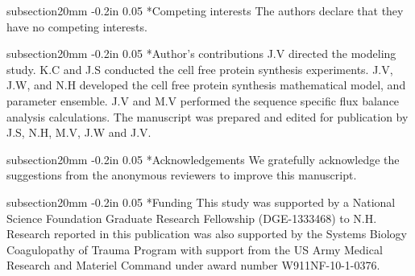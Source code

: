 \documentclass[12pt]{article}
\makeatletter
\renewcommand\section{\@startsection
	{subsection}{2}{0mm}
	{-0.2in}
	{0.05\baselineskip}
	{\normalfont\large\bfseries}}
\makeatother
\begin{document}


\clearpage

\section*{Competing interests}
The authors declare that they have no competing interests.

\section*{Author's contributions}
J.V directed the modeling study.
K.C and J.S conducted the cell free protein synthesis experiments.
J.V, J.W, and N.H developed the cell free protein synthesis mathematical model, and parameter ensemble.
J.V and M.V performed the sequence specific flux balance analysis calculations.
The manuscript was prepared and edited for publication by J.S, N.H, M.V, J.W and J.V.

\section*{Acknowledgements}
We gratefully acknowledge the suggestions from the anonymous reviewers to improve this manuscript.

\section*{Funding}
This study was supported by a National Science Foundation Graduate Research Fellowship (DGE-1333468) to N.H.
Research reported in this publication was also supported by the Systems Biology Coagulopathy of Trauma Program
with support from the US Army Medical Research and Materiel Command under award number W911NF-10-1-0376.

\clearpage



\clearpage

\end{document}
